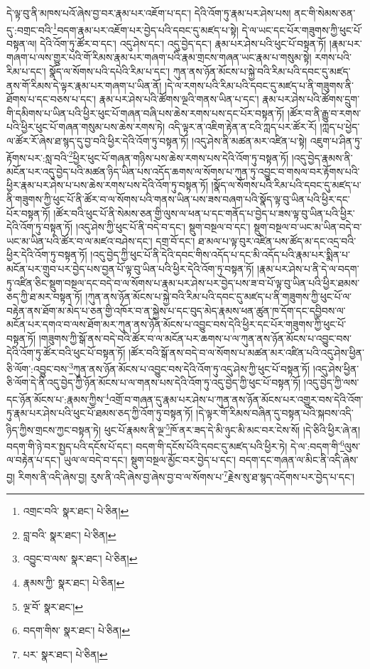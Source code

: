 དེ་ལྟ་བུ་ནི་མཁས་པའོ་ཞེས་བྱ་བར་རྣམ་པར་འཇོག་པ་དང་། དེའི་འོག་ཏུ་རྣམ་པར་ཤེས་པས། ནང་གི་སེམས་ཅན་དུ་:བགྲང་བའི་\footnote{འགྲང་བའི་  སྣར་ཐང་།  པེ་ཅིན། }བདག་རྣམ་པར་འཇོག་པར་བྱེད་པའི་དབང་དུ་མཛད་པ་སྟེ། དེ་ལ་ཡང་དང་པོར་གཟུགས་ཀྱི་ཕུང་པོ་བསྟན་ལ། དེའི་འོག་ཏུ་ཚོར་བ་དང་། འདུ་ཤེས་དང་། འདུ་བྱེད་དང་། རྣམ་པར་ཤེས་པའི་ཕུང་པོ་བསྟན་ཏོ། །རྣམ་པར་གཞག་པ་ལས་གྱུར་པའི་གོ་རིམས་རྣམ་པར་གཞག་པའི་རྣམ་གྲངས་གཞན་ཡང་རྣམ་པ་གསུམ་སྟེ། རགས་པའི་རིམ་པ་དང་། སྣོད་ལ་སོགས་པའི་དཔེའི་རིམ་པ་དང་། ཀུན་ནས་ཉོན་མོངས་པ་སྐྱེ་བའི་རིམ་པའི་དབང་དུ་མཛད་ནས་གོ་རིམས་དེ་ལྟར་རྣམ་པར་གཞག་པ་ཡིན་ནོ། །དེ་ལ་རགས་པའི་རིམ་པའི་དབང་དུ་མཛད་པ་ནི་གཟུགས་ནི་ཐོགས་པ་དང་བཅས་པ་དང་། རྣམ་པར་ཤེས་པའི་ཚོགས་ལྔའི་གནས་ཡིན་པ་དང་། རྣམ་པར་ཤེས་པའི་ཚོགས་དྲུག་གི་དམིགས་པ་ཡིན་པའི་ཕྱིར་ཕུང་པོ་གཞན་བཞི་པས་ཆེས་རགས་པས་དང་པོར་བསྟན་ཏོ། །ཚོར་བ་ནི་རྒྱུ་བ་རགས་པའི་ཕྱིར་ཕུང་པོ་གཞན་གསུམ་པས་ཆེས་རགས་ཏེ། འདི་ལྟར་ན་འཇིག་རྟེན་ན་ངའི་ཀླད་པར་ཚོར་རོ། །ཀླད་པ་ཕྱེད་ལ་ཚོར་རོ་ཞེས་ཐ་སྙད་དུ་བྱ་བའི་ཕྱིར་དེའི་འོག་ཏུ་བསྟན་ཏོ། །འདུ་ཤེས་ནི་མཚན་མར་འཛིན་པ་སྟེ། འཇུག་པ་ཤིན་ཏུ་རྟོགས་པར་:སླ་བའི་\footnote{བླ་བའི་  སྣར་ཐང་།  པེ་ཅིན། }ཕྱིར་ཕུང་པོ་གཞན་གཉིས་པས་ཆེས་རགས་པས་དེའི་འོག་ཏུ་བསྟན་ཏོ། །འདུ་བྱེད་རྣམས་ནི་མངོན་པར་འདུ་བྱེད་པའི་མཚན་ཉིད་ཡིན་པས་འདོད་ཆགས་ལ་སོགས་པ་ཀུན་ཏུ་འབྱུང་བ་གསལ་བར་རྟོགས་པའི་ཕྱིར་རྣམ་པར་ཤེས་པ་པས་ཆེས་རགས་པས་དེའི་འོག་ཏུ་བསྟན་ཏོ། །སྣོད་ལ་སོགས་པའི་རིམ་པའི་དབང་དུ་མཛད་པ་ནི་གཟུགས་ཀྱི་ཕུང་པོ་ནི་ཚོར་བ་ལ་སོགས་པའི་གནས་ཡིན་པས་ཟས་བཞག་པའི་སྣོད་ལྟ་བུ་ཡིན་པའི་ཕྱིར་དང་པོར་བསྟན་ཏོ། །ཚོར་བའི་ཕུང་པོ་ནི་སེམས་ཅན་གྱི་ལུས་ལ་ཕན་པ་དང་གནོད་པ་བྱེད་པ་ཟས་ལྟ་བུ་ཡིན་པའི་ཕྱིར་དེའི་འོག་ཏུ་བསྟན་ཏོ། །འདུ་ཤེས་ཀྱི་ཕུང་པོ་ནི་བདེ་བ་དང་། སྡུག་བསྔལ་བ་དང་། སྡུག་བསྔལ་བ་ཡང་མ་ཡིན་བདེ་བ་ཡང་མ་ཡིན་པའི་ཚོར་བ་ལ་མཛའ་བཤེས་དང་། དགྲ་བོ་དང་། ཐ་མལ་པ་ལྟ་བུར་འཛིན་པས་ཚོད་མ་དང་འདྲ་བའི་ཕྱིར་དེའི་འོག་ཏུ་བསྟན་ཏོ། །འདུ་བྱེད་ཀྱི་ཕུང་པོ་ནི་དེའི་དབང་གིས་འདོད་པ་དང་མི་འདོད་པའི་རྣམ་པར་སྨིན་པ་མངོན་པར་གྲུབ་པར་བྱེད་པས་བྱན་པོ་ལྟ་བུ་ཡིན་པའི་ཕྱིར་དེའི་འོག་ཏུ་བསྟན་ཏོ། །རྣམ་པར་ཤེས་པ་ནི་དེ་ལ་བདག་ཏུ་འཛིན་ཅིང་སྡུག་བསྔལ་དང་བདེ་བ་ལ་སོགས་པ་རྣམ་པར་ཤེས་པར་བྱེད་པས་ཟ་བ་པོ་ལྟ་བུ་ཡིན་པའི་ཕྱིར་ཐམས་ཅད་ཀྱི་ཐ་མར་བསྟན་ཏོ། །ཀུན་ནས་ཉོན་མོངས་པ་སྐྱེ་བའི་རིམ་པའི་དབང་དུ་མཛད་པ་ནི་གཟུགས་ཀྱི་ཕུང་པོ་ལ་བརྟེན་ནས་ཐོག་མ་མེད་པ་ཅན་གྱི་འཁོར་བ་ན་སྐྱེས་པ་དང་བུད་མེད་རྣམས་ཕན་ཚུན་ཁ་དོག་དང་དབྱིབས་ལ་མངོན་པར་དགའ་བ་ལས་ཐོག་མར་ཀུན་ནས་ཉོན་མོངས་པ་འབྱུང་བས་དེའི་ཕྱིར་དང་པོར་གཟུགས་ཀྱི་ཕུང་པོ་བསྟན་ཏོ། །གཟུགས་ཀྱི་སྒོ་ནས་བདེ་བའི་ཚོར་བ་ལ་མངོན་པར་ཆགས་པ་ལ་ཀུན་ནས་ཉོན་མོངས་པ་འབྱུང་བས་དེའི་འོག་ཏུ་ཚོར་བའི་ཕུང་པོ་བསྟན་ཏོ། །ཚོར་བའི་སྒོ་ནས་བདེ་བ་ལ་སོགས་པ་མཚན་མར་འཛིན་པའི་འདུ་ཤེས་ཕྱིན་ཅི་ལོག་:འབྱུང་བས་\footnote{འབྱུང་བ་ལས་  སྣར་ཐང་།  པེ་ཅིན། }ཀུན་ནས་ཉོན་མོངས་པ་འབྱུང་བས་དེའི་འོག་ཏུ་འདུ་ཤེས་ཀྱི་ཕུང་པོ་བསྟན་ཏོ། །འདུ་ཤེས་ཕྱིན་ཅི་ལོག་དེ་ནི་འདུ་བྱེད་ཀྱི་ཉོན་མོངས་པ་ལ་གནས་པས་དེའི་འོག་ཏུ་འདུ་བྱེད་ཀྱི་ཕུང་པོ་བསྟན་ཏོ། །འདུ་བྱེད་ཀྱི་ལས་དང་ཉོན་མོངས་པ་:རྣམས་ཀྱིས་\footnote{རྣམས་ཀྱི་  སྣར་ཐང་།  པེ་ཅིན། }འགྲོ་བ་གཞན་དུ་རྣམ་པར་ཤེས་པ་ཀུན་ནས་ཉོན་མོངས་པར་འགྱུར་བས་དེའི་འོག་ཏུ་རྣམ་པར་ཤེས་པའི་ཕུང་པོ་ཐམས་ཅད་ཀྱི་འོག་ཏུ་བསྟན་ཏོ། །དེ་ལྟར་གོ་རིམས་བཞིན་དུ་བསྟན་པའི་སྐབས་འདི་ཉིད་ཀྱིས་གྲངས་ཀྱང་བསྟན་ཏེ། ཕུང་པོ་རྣམས་ནི་ལྔ་\footnote{ལྔ་བོ་  སྣར་ཐང་། }ཁོ་ནར་ཟད་དེ་མི་ཉུང་མི་མང་བར་ངེས་སོ། །དེ་ཅིའི་ཕྱིར་ཞེ་ན། བདག་གི་ཉེ་བར་སྤྱད་པའི་དངོས་པོ་དང་། བདག་གི་དངོས་པོའི་དབང་དུ་མཛད་པའི་ཕྱིར་ཏེ། དེ་ལ་:བདག་གི་\footnote{བདག་གིས་  སྣར་ཐང་།  པེ་ཅིན། }ལུས་ལ་བརྟེན་པ་དང་། ཡུལ་ལ་བདེ་བ་དང་། སྡུག་བསྔལ་མྱོང་བར་བྱེད་པ་དང་། བདག་དང་གཞན་ལ་མིང་ནི་འདི་ཞེས་བྱ། རིགས་ནི་འདི་ཞེས་བྱ། རུས་ནི་འདི་ཞེས་བྱ་ཞེས་བྱ་བ་ལ་སོགས་པ་\footnote{པར་  སྣར་ཐང་།  པེ་ཅིན། }རྗེས་སུ་ཐ་སྙད་འདོགས་པར་བྱེད་པ་དང་། 